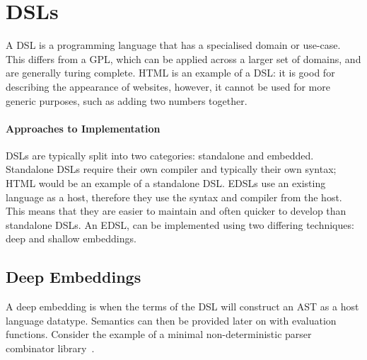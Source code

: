 \documentclass[dissertation.tex]{subfiles}
\newcommand{\Conid}[1]{\mathit{#1}}
\newcommand{\Varid}[1]{\mathit{#1}}
\def\resethooks{%
  \global\let\SaveRestoreHook\empty
  \global\let\ColumnHook\empty}
\newcommand{\hsindent}[1]{\quad}%
\let\hspre\empty
\let\hspost\empty
\providecommand\codeskip{\mskip\codemuskip}%
\let\codefont\textsf
\renewcommand\Varid[1]{\codefont{#1}}
\let\Conid\Varid
\begin{document}
\section{\acp{DSL}}
A \ac{DSL} is a programming language that has a specialised domain or use-case.
This differs from a \ac{GPL}, which can be applied across a larger set of domains, and are generally turing complete.
HTML is an example of a \ac{DSL}: it is good for describing the appearance of websites, however,
it cannot be used for more generic purposes, such as adding two numbers together.

\paragraph{Approaches to Implementation}
DSLs are typically split into two categories: standalone and embedded.
Standalone DSLs require their own compiler and typically their own syntax; HTML would be an example of a standalone DSL.
\acp{EDSL} use an existing language as a host, therefore they use the syntax and compiler from the host.
This means that they are easier to maintain and often quicker to develop than standalone DSLs.
An \ac{EDSL}, can be implemented using two differing techniques: deep and shallow embeddings.



\subsection{Deep Embeddings}
A deep embedding is when the terms of the \ac{DSL} will construct an \ac{AST} as a host language datatype.
Semantics can then be provided later on with evaluation functions.
Consider the example of a minimal non-deterministic parser combinator library~\cite{wuYoda}.


\resethooks
\end{document}
